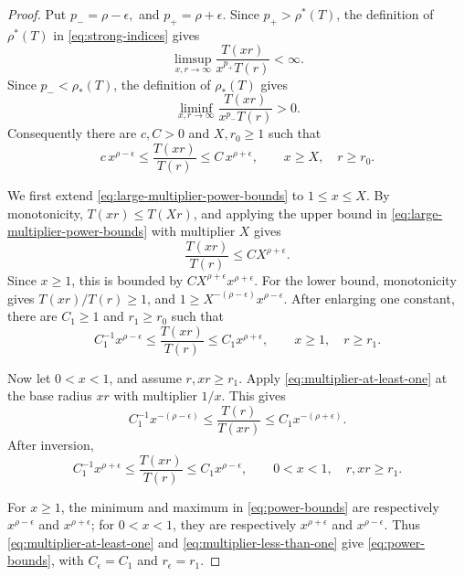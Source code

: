 \documentclass[12pt,letterpaper,reqno]{amsart}
\theoremstyle{definition}
\numberwithin{equation}{section}
\begin{document}
\begin{proof}

Put
$
p_-=\rho-\epsilon,
$ and $
p_+=\rho+\epsilon.
$
Since \(p_+>\rho^*(T)\), the definition of \(\rho^*(T)\) in
\eqref{eq:strong-indices} gives
\[
\limsup_{x,r\to\infty}
\frac{T(xr)}{x^{p_+}T(r)}
<\infty.
\]
Since \(p_-<\rho_*(T)\), the definition of \(\rho_*(T)\) gives
\[
\liminf_{x,r\to\infty}
\frac{T(xr)}{x^{p_-}T(r)}
>0.
\]
Consequently there are \(c,C>0\) and \(X,r_0\geq1\) such that
\begin{equation}\label{eq:large-multiplier-power-bounds}
 c\,x^{\rho-\epsilon}
 \leq
 \frac{T(xr)}{T(r)}
 \leq
 C\,x^{\rho+\epsilon},
 \qquad
 x\geq X,\quad r\geq r_0.
\end{equation}

We first extend \eqref{eq:large-multiplier-power-bounds} to
\(1\leq x\leq X\). By monotonicity,
\(T(xr)\leq T(Xr)\), and applying the upper bound in
\eqref{eq:large-multiplier-power-bounds} with multiplier \(X\) gives
\[
\frac{T(xr)}{T(r)}
\leq
CX^{\rho+\epsilon}.
\]
Since \(x\geq1\), this is bounded by
\(CX^{\rho+\epsilon}x^{\rho+\epsilon}\).
For the lower bound, monotonicity gives
\(T(xr)/T(r)\geq1\), and
\(1\geq X^{-(\rho-\epsilon)}x^{\rho-\epsilon}\).
After enlarging one constant, there are
\(C_1\geq1\) and \(r_1\geq r_0\) such that
\begin{equation}\label{eq:multiplier-at-least-one}
 C_1^{-1}x^{\rho-\epsilon}
 \leq
 \frac{T(xr)}{T(r)}
 \leq
 C_1x^{\rho+\epsilon},
 \qquad
 x\geq1,\quad r\geq r_1.
\end{equation}

Now let \(0<x<1\), and assume \(r,xr\geq r_1\). Apply
\eqref{eq:multiplier-at-least-one} at the base radius \(xr\) with
multiplier \(1/x\). This gives
\[
C_1^{-1}x^{-(\rho-\epsilon)}
\leq
\frac{T(r)}{T(xr)}
\leq
C_1x^{-(\rho+\epsilon)}.
\]
After inversion,
\begin{equation}\label{eq:multiplier-less-than-one}
 C_1^{-1}x^{\rho+\epsilon}
 \leq
 \frac{T(xr)}{T(r)}
 \leq
 C_1x^{\rho-\epsilon},
 \qquad
 0<x<1,\quad r,xr\geq r_1.
\end{equation}

For \(x\geq1\), the minimum and maximum in
\eqref{eq:power-bounds} are respectively
\(x^{\rho-\epsilon}\) and \(x^{\rho+\epsilon}\);
for \(0<x<1\), they are respectively
\(x^{\rho+\epsilon}\) and \(x^{\rho-\epsilon}\).
Thus \eqref{eq:multiplier-at-least-one} and
\eqref{eq:multiplier-less-than-one} give
\eqref{eq:power-bounds}, with
\(C_\epsilon=C_1\) and \(r_\epsilon=r_1\).
\end{proof}
\end{document}
